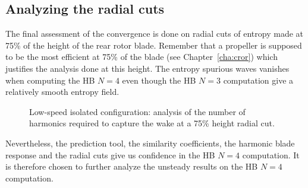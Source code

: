 \subsection{Analyzing the radial cuts}
\label{sub:dream_ls_conv_hb_slice_r}
The final assessment of the convergence is done on radial cuts
of entropy made at 75\% of the height of the rear rotor blade. 
Remember that a propeller is supposed to be the most efficient at 75\% of the
blade (see Chapter~\ref{cha:cror}) which justifies the analysis done at this height.
The entropy spurious waves vanishes when computing the HB $N=4$ even though
the HB $N=3$ computation give a relatively smooth entropy field.
\begin{figure}[htp]
  \centering
  \caption{Low-speed isolated configuration: analysis of the number of harmonics
  required to capture the wake at a 75\% height radial cut.}
  \label{fig:dream_ls_hb_slice_r_conv}
\end{figure}
Nevertheless, the prediction tool, the
similarity coefficients, the harmonic blade response and the radial cuts give us confidence in
the HB $N=4$ computation. It is therefore chosen to further analyze the unsteady 
results on the HB $N=4$ computation.
